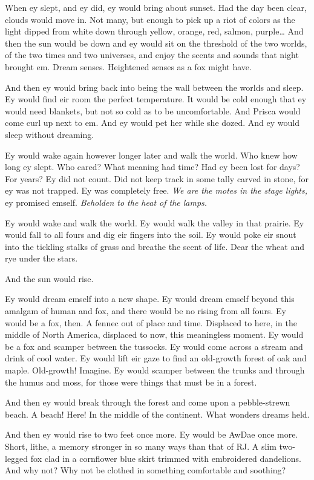 When ey slept, and ey did, ey would bring about sunset. Had the day been clear, clouds would move in. Not many, but enough to pick up a riot of colors as the light dipped from white down through yellow, orange, red, salmon, purple\ldots{} And then the sun would be down and ey would sit on the threshold of the two worlds, of the two times and two universes, and enjoy the scents and sounds that night brought em. Dream senses. Heightened senses as a fox might have.

And then ey would bring back into being the wall between the worlds and sleep. Ey would find eir room the perfect temperature. It would be cold enough that ey would need blankets, but not so cold as to be uncomfortable. And Prisca would come curl up next to em. And ey would pet her while she dozed. And ey would sleep without dreaming.

Ey would wake again however longer later and walk the world. Who knew how long ey slept. Who cared? What meaning had time? Had ey been lost for days? For years? Ey did not count. Did not keep track in some tally carved in stone, for ey was not trapped. Ey was completely free. \emph{We are the motes in the stage lights,} ey promised emself. \emph{Beholden to the heat of the lamps.}

Ey would wake and walk the world. Ey would walk the valley in that prairie. Ey would fall to all fours and dig eir fingers into the soil. Ey would poke eir snout into the tickling stalks of grass and breathe the scent of life. Dear the wheat and rye under the stars.

And the sun would rise.

Ey would dream emself into a new shape. Ey would dream emself beyond this amalgam of human and fox, and there would be no rising from all fours. Ey would be a fox, then. A fennec out of place and time. Displaced to here, in the middle of North America, displaced to now, this meaningless moment. Ey would be a fox and scamper between the tussocks. Ey would come across a stream and drink of cool water. Ey would lift eir gaze to find an old-growth forest of oak and maple. Old-growth! Imagine. Ey would scamper between the trunks and through the humus and moss, for those were things that must be in a forest.

And then ey would break through the forest and come upon a pebble-strewn beach. A beach! Here! In the middle of the continent. What wonders dreams held.

And then ey would rise to two feet once more. Ey would be AwDae once more. Short, lithe, a memory stronger in so many ways than that of RJ. A slim two-legged fox clad in a cornflower blue skirt trimmed with embroidered dandelions. And why not? Why not be clothed in something comfortable and soothing?

